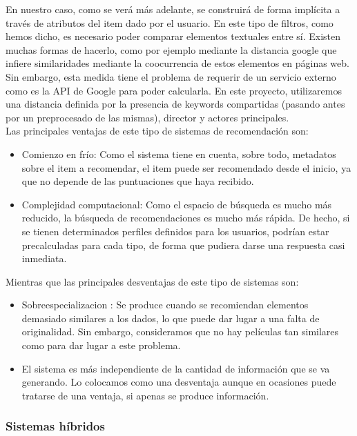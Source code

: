 En nuestro caso, como se verá más adelante, se construirá de forma implícita a través de atributos del item dado por el usuario. En este tipo de filtros, como hemos dicho, es necesario poder comparar elementos textuales entre sí. Existen muchas formas de hacerlo, como por ejemplo mediante la distancia google \cite{cilibrasi} que infiere similaridades mediante la coocurrencia de estos elementos en páginas web. Sin embargo, esta medida tiene el problema de requerir de un servicio externo como es la API de Google para poder calcularla. En este proyecto, utilizaremos una distancia definida por la presencia de keywords compartidas (pasando antes por un preprocesado de las mismas), director y actores principales.\\

Las principales ventajas de este tipo de sistemas de recomendación son:
\begin{itemize}
    \item Comienzo en frío: Como el sistema tiene en cuenta, sobre todo, metadatos sobre el item a recomendar, el item puede ser recomendado desde el inicio, ya que no depende de las puntuaciones que haya recibido.
    \item Complejidad computacional: Como el espacio de búsqueda es mucho más reducido, la búsqueda de recomendaciones es mucho más rápida. De hecho, si se tienen determinados perfiles definidos para los usuarios, podrían estar precalculadas para cada tipo, de forma que pudiera darse una respuesta casi inmediata.
\end{itemize}

Mientras que las principales desventajas de este tipo de sistemas son:
\begin{itemize}
    \item Sobreespecializacion \cite{zhang}: Se produce cuando se recomiendan elementos demasiado similares a los dados, lo que puede dar lugar a una falta de originalidad. Sin embargo, consideramos que no hay películas tan similares como para dar lugar a este problema.
    \item El sistema es más independiente de la cantidad de información que se va generando. Lo colocamos como una desventaja aunque en ocasiones puede tratarse de una ventaja, si apenas se produce información.
\end{itemize}



\subsubsection{Sistemas híbridos}\label{sec:hibridos}

